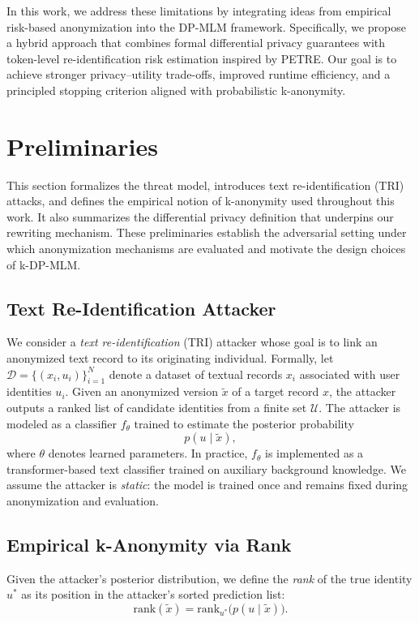 \documentclass[10pt, a4paper]{article}
\begin{document}
In this work, we address these limitations by integrating ideas from empirical risk-based anonymization into the DP-MLM framework. Specifically, we propose a hybrid approach that combines formal differential privacy guarantees with token-level re-identification risk estimation inspired by PETRE. Our goal is to achieve stronger privacy–utility trade-offs, improved runtime efficiency, and a principled stopping criterion aligned with probabilistic k-anonymity.

\section{Preliminaries}\label{sec:preliminaries}

This section formalizes the threat model, introduces text re-identification (TRI) attacks, and defines the empirical notion of k-anonymity used throughout this work. It also summarizes the differential privacy definition that underpins our rewriting mechanism. These preliminaries establish the adversarial setting under which anonymization mechanisms are evaluated and motivate the design choices of k-DP-MLM.

\subsection{Text Re-Identification Attacker}

We consider a \emph{text re-identification} (TRI) attacker whose goal is to link an anonymized text record to its originating individual. Formally, let $\mathcal{D} = \{(x_i, u_i)\}_{i=1}^N$ denote a dataset of textual records $x_i$ associated with user identities $u_i$. Given an anonymized version $\tilde{x}$ of a target record $x$, the attacker outputs a ranked list of candidate identities from a finite set $\mathcal{U}$. The attacker is modeled as a classifier $f_\theta$ trained to estimate the posterior probability
\[
p(u \mid \tilde{x}),
\]
where $\theta$ denotes learned parameters. In practice, $f_\theta$ is implemented as a transformer-based text classifier trained on auxiliary background knowledge. We assume the attacker is \emph{static}: the model is trained once and remains fixed during anonymization and evaluation.

\subsection{Empirical k-Anonymity via Rank}

Given the attacker’s posterior distribution, we define the \emph{rank} of the true identity $u^\ast$ as its position in the attacker’s sorted prediction list:
\[
\mathrm{rank}(\tilde{x}) = \mathrm{rank}_{u^\ast} \big( p(u \mid \tilde{x}) \big).
\]
\end{document}
